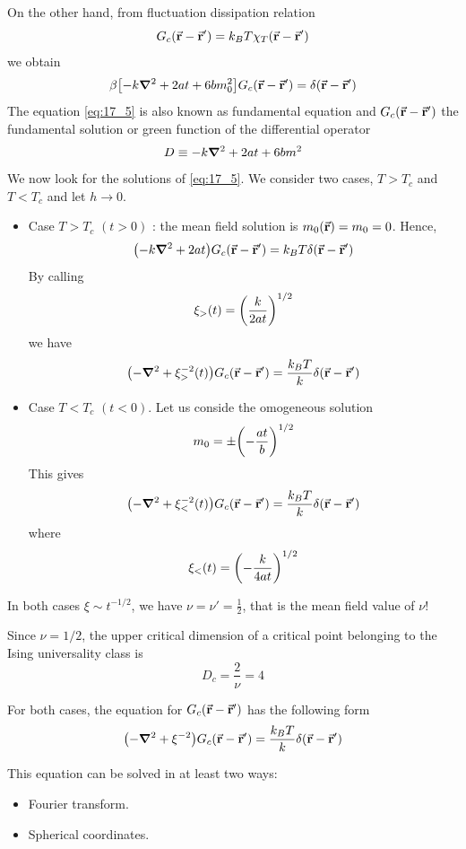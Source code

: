 \documentclass[../main/main.tex]{subfiles}
\begin{document}
On the other hand, from fluctuation dissipation relation
\begin{equation}
  G_c (\va{r}-\va{r}') = k_B T \chi _T (\va{r}-\va{r}')
\end{equation}
we obtain
\begin{equation}
  \beta \qty[-k \grad ^2 + 2 a t + 6 b m_0 ^2 ] G_c (\va{r}-\va{r}') = \delta (\va{r}- \va{r}')
  \label{eq:17_5}
\end{equation}
The equation \eqref{eq:17_5} is also known as fundamental equation and \( G_c (\va{r}- \va{r}') \)  the fundamental solution or green function of the differential operator
\begin{equation}
  D \equiv - k \grad ^2 + 2 a t + 6 b m^2
\end{equation}
We now look for the solutions of \eqref{eq:17_5}.  We consider two cases, \( T > T_c \) and \( T < T_c \) and let \( h \rightarrow 0 \).
\begin{itemize}
\item Case \( T > T_c \) \( (t>0) \) : the mean field solution is \( m_0 (\va{r}) = m_0 = 0 \). Hence,
\begin{equation}
  \qty(-k \grad ^2 + 2 a t ) G_c (\va{r}-\va{r}') = k_B T \delta (\va{r}-\va{r}')
  \label{eq:17_6}
\end{equation}
By calling
\begin{equation}
  \xi_> (t) = \qty(\frac{k}{2 a t })^{1/2}
\end{equation}
we have
\begin{equation}
  \qty(-\grad ^2 + \xi _> ^{-2} (t)) G_c (\va{r}-\va{r}') = \frac{k_B T}{k} \delta (\va{r}-\va{r}')
\end{equation}
\item Case \( T < T_c \) \( (t<0) \). Let us conside the omogeneous solution
\begin{equation}
  m_0 = \pm \qty(-\frac{at}{b})^{1/2}
\end{equation}
This gives
\begin{equation}
  \qty(-\grad ^2 + \xi _<^{-2} (t))G_c (\va{r}- \va{r}') = \frac{k_B T}{k} \delta (\va{r}- \va{r}')
\end{equation}
where
\begin{equation}
  \xi _{<} (t) = \qty(- \frac{k}{4at})^{1/2}
\end{equation}
\end{itemize}
\begin{remark}
In both cases \( \xi \sim t^{-1/2} \), we have \( \nu = \nu ' = \frac{1}{2} \), that is the mean field value of \( \nu  \)!
\end{remark}
\begin{remark}
Since \( \nu = 1/2 \), the upper critical dimension of a critical point belonging to the Ising universality class is
\begin{equation}
  D_c = \frac{2}{\nu } = 4
\end{equation}
\end{remark}
For both cases, the equation for \( G_c (\va{r}-\va{r}') \) has the following form
\begin{equation}
  \qty(- \grad ^2 + \xi ^{-2}) G_c (\va{r}-\va{r}') = \frac{k_B T}{k} \delta (\va{r}-\va{r}')
\end{equation}

This equation can be solved in at least two ways:
\begin{itemize}
\item Fourier transform.
\item Spherical coordinates.
\end{itemize}
\end{document}
